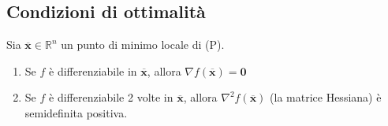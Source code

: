 \subsection{Condizioni di ottimalit\`a}
\begin{theo} Sia
$\mathbf{\overline{x}} \in \mathbb{R}^{n}$ un punto di minimo locale di (P).
\begin{enumerate}
 \item Se $f$ \`e differenziabile in $\mathbf{\overline{x}}$, allora
$\nabla f(\mathbf{\overline{x}}) = \mathbf{0}$
 \item Se $f$ \`e differenziabile 2 volte in $\mathbf{\overline{x}}$,
allora $\nabla^{2}f(\mathbf{\overline{x}})$ (la matrice Hessiana) \`e
semidefinita positiva.
\end{enumerate}
\end{theo}

